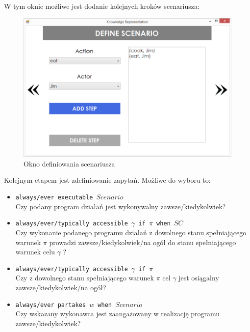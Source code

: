 \documentclass{article}
\begin{document}
W tym oknie możliwe jest dodanie kolejnych kroków scenariusza:

\begin{figure}[H]
\centering
\includegraphics[scale=0.4]{10}
\caption{Okno definiowania scenariusza}
\end{figure}
\newpage
Kolejnym etapem jest zdefiniowanie zapytań. Możliwe do wyboru to:
\begin{itemize}
\item {\large\texttt{always/ever executable $Scenario$}} \\
Czy podany program działań jest wykonywalny zawsze/kiedykolwiek?
\item {\large\texttt{always/ever/typically accessible $\gamma$ if $\pi$ when $SC$}}\\
Czy wykonanie podanego programu działań z dowolnego stanu spełniającego warunek $\pi$ prowadzi zawsze/kiedykolwiek/na ogół do stanu spełniającego warunek celu $\gamma$ ?
\item {\large\texttt{always/ever/typically accessible $\gamma$ if $\pi$}}\\
Czy z dowolnego stanu spełniającego warunek $\pi$ cel $\gamma$ jest osiągalny zawsze/kiedykolwiek/na ogół?
\item {\large\texttt{always/ever partakes $w$ when $Scenario$}} \\
Czy wskazany wykonawca jest zaangażowany w realizację programu zawsze/kiedykolwiek?
\end{itemize}
\end{document}
